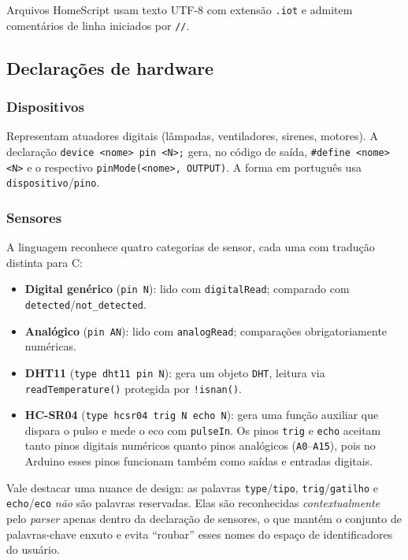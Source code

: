 \documentclass[conference]{IEEEtran}
\begin{document}
Arquivos HomeScript usam texto UTF-8 com extensão \texttt{.iot} e admitem
comentários de linha iniciados por \texttt{//}.

\subsection{Declarações de hardware}

\subsubsection{Dispositivos}
Representam atuadores digitais (lâmpadas, ventiladores, sirenes, motores).
A declaração \texttt{device <nome> pin <N>;} gera, no código de saída,
\texttt{\#define <nome> <N>} e o respectivo \texttt{pinMode(<nome>, OUTPUT)}.
A forma em português usa \texttt{dispositivo}/\texttt{pino}.

\subsubsection{Sensores}
A linguagem reconhece quatro categorias de sensor, cada uma com tradução
distinta para C:
\begin{itemize}
\item \textbf{Digital genérico} (\texttt{pin N}): lido com
\texttt{digitalRead}; comparado com \texttt{detected}/\texttt{not\_detected}.
\item \textbf{Analógico} (\texttt{pin AN}): lido com \texttt{analogRead};
comparações obrigatoriamente numéricas.
\item \textbf{DHT11} (\texttt{type dht11 pin N}): gera um objeto
\texttt{DHT}, leitura via \texttt{readTemperature()} protegida por
\texttt{!isnan()}.
\item \textbf{HC-SR04} (\texttt{type hcsr04 trig N echo N}): gera uma
função auxiliar que dispara o pulso e mede o eco com \texttt{pulseIn}.
Os pinos \texttt{trig} e \texttt{echo} aceitam tanto pinos digitais
numéricos quanto pinos analógicos (\texttt{A0}--\texttt{A15}), pois no
Arduino esses pinos funcionam também como saídas e entradas digitais.
\end{itemize}

Vale destacar uma nuance de design: as palavras \texttt{type}/\texttt{tipo},
\texttt{trig}/\texttt{gatilho} e \texttt{echo}/\texttt{eco} \emph{não} são
palavras reservadas. Elas são reconhecidas \emph{contextualmente} pelo
\emph{parser} apenas dentro da declaração de sensores, o que mantém o
conjunto de palavras-chave enxuto e evita ``roubar'' esses nomes do espaço
de identificadores do usuário.
\end{document}

